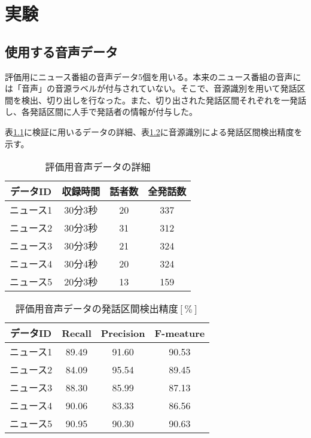 \chapter{実験}
\section{使用する音声データ}
評価用にニュース番組の音声データ5個を用いる。本来のニュース番組の音声には「音声」の音源ラベルが付与されていない。そこで、音源識別を用いて発話区間を検出、切り出しを行なった。また、切り出された発話区間それぞれを一発話し、各発話区間に人手で発話者の情報が付与した。\par
表\ref{table:test_detail}に検証に用いるデータの詳細、表\ref{table:test_detail_RPF}に音源識別による発話区間検出精度を示す。

\begin{table}[H]
  \begin{center}
    \caption{評価用音声データの詳細 \label{table:test_detail}}
    \begin{tabular}{|c||c|c|c|} \hline
      データID & 収録時間 & 話者数 & 全発話数 \\ \hline
      ニュース1 & 30分3秒 & 20 & 337 \\ \hline
      ニュース2 & 30分3秒 & 31 & 312\\ \hline
      ニュース3 & 30分3秒 & 21 & 324 \\ \hline
      ニュース4 & 30分4秒 & 20 & 324\\ \hline
      ニュース5 & 20分3秒 & 13 & 159\\ \hline
    \end{tabular}
  \end{center}
\end{table}

\begin{table}[H]
  \begin{center}
    \caption{評価用音声データの発話区間検出精度$[\%]$ \label{table:test_detail_RPF}}
    \begin{tabular}{|c||c|c|c|} \hline
      データID & Recall & Precision & F-meature \\ \hline
      ニュース1 & 89.49 & 91.60 & 90.53 \\ \hline
      ニュース2 & 84.09 & 95.54 & 89.45\\ \hline
      ニュース3 & 88.30 & 85.99 & 87.13 \\ \hline
      ニュース4 & 90.06 & 83.33 & 86.56\\ \hline
      ニュース5 & 90.95 & 90.30 & 90.63\\ \hline
    \end{tabular}
  \end{center}
\end{table}



